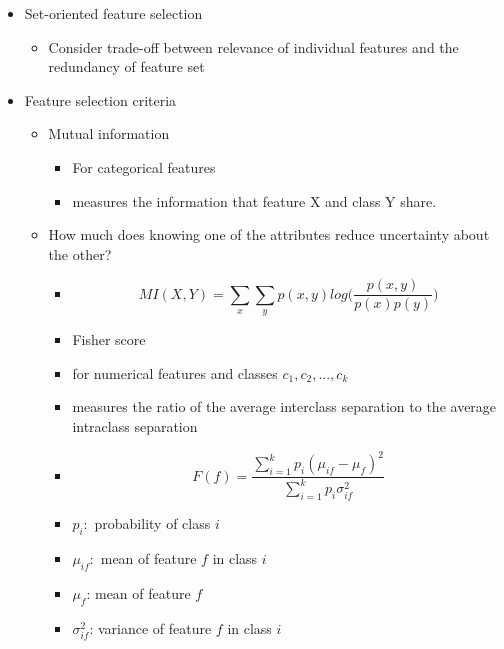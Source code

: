 \documentclass[../notes.tex]{subfiles}
\begin{document}
\begin{itemize}
\begin{itemize}
    \item Set-oriented feature selection 
    \begin{itemize}
      \item  Consider trade-off between relevance of individual features and the redundancy of feature set
    \end{itemize}

    \item Feature selection criteria
    \begin{itemize}
      \item Mutual information
      \begin{itemize}
        \item For categorical features
        \item measures the information that feature X and class Y share.
      \end{itemize}

      \item How much does knowing one of the attributes reduce uncertainty about the other?
      \begin{itemize}
        \item $$MI(X, Y) = \sum_x \sum_y p(x, y)log \bigg(\frac{p(x, y)}{p(x)p(y)}\bigg)$$
        \item Fisher score
        \item for numerical features and classes $c_1, c_2, ..., c_k$
        \item measures the ratio of the average interclass separation to the average intraclass separation
        \item $$F(f) = \frac{\sum_{i=1}^k p_i (\mu_{if} - \mu_f)^2}{\sum_{i=1}^k p_i \sigma_{if}^2}$$
        \item $p_i:$ probability of class $i$
        \item $\mu_{if}:$ mean of feature $f$ in class $i$
        \item $\mu_{f}$: mean of feature $f$
        \item $\sigma_{if}^2$: variance of feature $f$ in class $i$
      \end{itemize}      
    \end{itemize}  
  \end{itemize}
\end{itemize}
\end{document}
